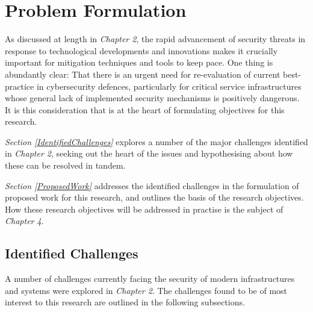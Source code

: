 \chapter{Problem Formulation} \label{Chapter3}

As discussed at length in \textit{Chapter 2}, the rapid advancement of security threats in response to technological developments and innovations makes it crucially important for mitigation techniques and tools to keep pace. One thing is abundantly clear: That there is an urgent need for re-evaluation of current best-practice in cybersecurity defences, particularly for critical service infrastructures whose general lack of implemented security mechanisms is positively dangerous. It is this consideration that is at the heart of formulating objectives for this research.

\textit{Section \ref{IdentifiedChallenges}} explores a number of the major challenges identified in \textit{Chapter 2}, seeking out the heart of the issues and hypothesising about how these can be resolved in tandem.

\textit{Section \ref{ProposedWork}} addresses the identified challenges in the formulation of proposed work for this research, and outlines the basis of the research objectives. How these research objectives will be addressed in practise is the subject of \textit{Chapter 4}.


%
%
%
%

\section{Identified Challenges \label{IdentifiedChallenges}}

A number of challenges currently facing the security of modern infrastructures and systems were explored in \textit{Chapter 2}. The challenges found to be of most interest to this research are outlined in the following subsections.


